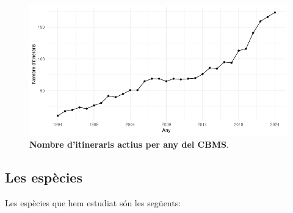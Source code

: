 \documentclass{article}
\begin{document}
\begin{figure}
  \centering
  \includegraphics[scale=0.8]{nombre-itineraris-per-any.png}
  \caption{\label{fig:IDsPerAny} \textbf{Nombre d'itineraris actius per any del CBMS}.}
\end{figure}
 
\smallskip


 
\subsection{Les espècies}
Les esp\`ecies que hem estudiat s\'on les seg\"uents: 
\end{document}
